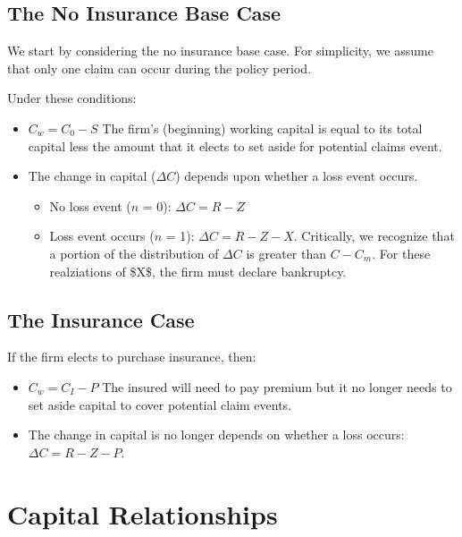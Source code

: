 \documentclass[
]{article}
\begin{document}
\hypertarget{the-no-insurance-base-case}{%
\subsection{The No Insurance Base
Case}\label{the-no-insurance-base-case}}

We start by considering the no insurance base case. For simplicity, we
assume that only one claim can occur during the policy period.

Under these conditions:

\begin{itemize}
\item
  \(C_w = C_0 - S\) The firm's (beginning) working capital is equal to
  its total capital less the amount that it elects to set aside for
  potential claims event.
\item
  The change in capital (\(\Delta C\)) depends upon whether a loss event
  occurs.

  \begin{itemize}
  \item
    No loss event (\(n\) = 0): \(\Delta C = R - Z\)
  \item
    Loss event occurs (\(n\) = 1): \(\Delta C = R - Z - X\). Critically,
    we recognize that a portion of the distribution of \(\Delta C\) is
    greater than \(C - C_m\). For these realziations of \$X\$, the firm
    must declare bankruptcy.
  \end{itemize}
\end{itemize}

\hypertarget{the-insurance-case}{%
\subsection{The Insurance Case}\label{the-insurance-case}}

If the firm elects to purchase insurance, then:

\begin{itemize}
\item
  \(C_w = C_I - P\) The insured will need to pay premium but it no
  longer needs to set aside capital to cover potential claim events.
\item
  The change in capital is no longer depends on whether a loss occurs:
  \(\Delta C = R - Z - P\).
\end{itemize}

\hypertarget{capital-relationships}{%
\section{Capital Relationships}\label{capital-relationships}}
\end{document}
